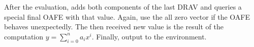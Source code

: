 \begin{JWprotocol}
\begin{JWprotoSteps}
  \item After the evaluation, \JWpTwo{} adds both components of the last DRAV
    and queries a special final OAFE with that value. Again, use the all zero
    vector if the OAFE behaves unexpectedly. The then received new value is the
    result of the computation $y = \sum_{i=0}^n a_ix^i$. Finally, output
     to the environment.

  \end{JWprotoSteps}

\end{JWprotocol}

\FloatBarrier

